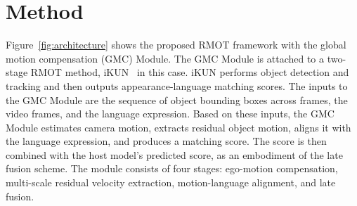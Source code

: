 \documentclass{article}
\begin{document}



\section{Method}
\label{sec:method}
Figure~\ref{fig:architecture} shows the proposed RMOT framework with the global motion compensation (GMC) Module. The GMC Module is attached to a two-stage RMOT method, iKUN~\cite{ikun} in this case. iKUN performs object detection and tracking and then outputs appearance-language matching scores. The inputs to the GMC Module are the sequence of object bounding boxes across frames, the video frames, and the language expression. Based on these inputs, the GMC Module estimates camera motion, extracts residual object motion, aligns it with the language expression, and produces a matching score. The score is then combined with the host model's predicted score, as an embodiment of the late fusion scheme. The module consists of four stages: ego-motion compensation, multi-scale residual velocity extraction, motion-language alignment, and late fusion.
\end{document}
